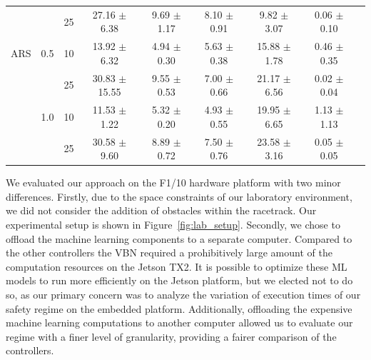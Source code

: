 \documentclass[manuscript,screen,review]{acmart}
\newcommand{\ttj}[1]{\textcolor{red}{\textbf{\underline{TTJ:}} #1}}
\newcommand{\figref}[1]{Figure~\ref{#1}}
\begin{document}
\begin{table}[ht]
{\begin{tabular}{ccccccccc}
    &     & 25 &  27.16 $\pm$   6.38 &    9.69 $\pm$  1.17 &           8.10 $\pm$  0.91 &     9.82 $\pm$  3.07 &                    0.06 $\pm$  0.10 \\
ARS & 0.5 & 10 &  13.92 $\pm$   6.32 &    4.94 $\pm$  0.30 &           5.63 $\pm$  0.38 &    15.88 $\pm$  1.78 &                    0.46 $\pm$  0.35 \\
    &     & 25 &  30.83 $\pm$  15.55 &    9.55 $\pm$  0.53 &           7.00 $\pm$  0.66 &    21.17 $\pm$  6.56 &                    0.02 $\pm$  0.04 \\
    & 1.0 & 10 &  11.53 $\pm$   1.22 &    5.32 $\pm$  0.20 &           4.93 $\pm$  0.55 &    19.95 $\pm$  6.65 &                    1.13 $\pm$  1.13 \\
    &     & 25 &  30.58 $\pm$   9.60 &    8.89 $\pm$  0.72 &           7.50 $\pm$  0.76 &    23.58 $\pm$  3.16 &                    0.05 $\pm$  0.05 \\
\end{tabular}}%
\end{table}


We evaluated our approach on the F1/10 hardware platform with two minor differences. Firstly, due to the space constraints of our laboratory environment, we did not consider the addition of obstacles within the racetrack. Our experimental setup is shown in \figref{fig:lab_setup}. Secondly, we chose to offload the machine learning components to a separate computer. Compared to the other controllers the VBN required a prohibitively large amount of the computation resources on the Jetson TX2. It is possible to optimize these ML models to run more efficiently on the Jetson platform, but we elected not to do so, as our primary concern was to analyze the variation of execution times of our safety regime on the embedded platform. Additionally, offloading the expensive machine learning computations to another computer allowed us to evaluate our regime with a finer level of granularity, providing a fairer comparison of the controllers.








\end{document}
